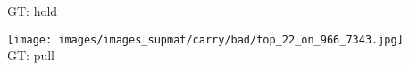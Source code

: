 \documentclass[10pt,twocolumn,letterpaper]{article}
\begin{document}
\begin{figure*}[t]
\begin{minipage}[t]{0.18\textwidth}
       	\vspace{0.3ex}
       	GT: hold
       	\vspace{0.2ex}
   	\end{minipage}
    \hspace{0.005\textwidth}
    \begin{minipage}[t]{0.18\textwidth}
    	\centering
       	\texttt{[image: images/images\_supmat/carry/bad/top\_22\_on\_966\_7343.jpg]}\\
       	\vspace{0.3ex}
       	GT: pull
       	\vspace{0.2ex}
    \end{minipage}   
  

\end{figure*}
\end{document}
